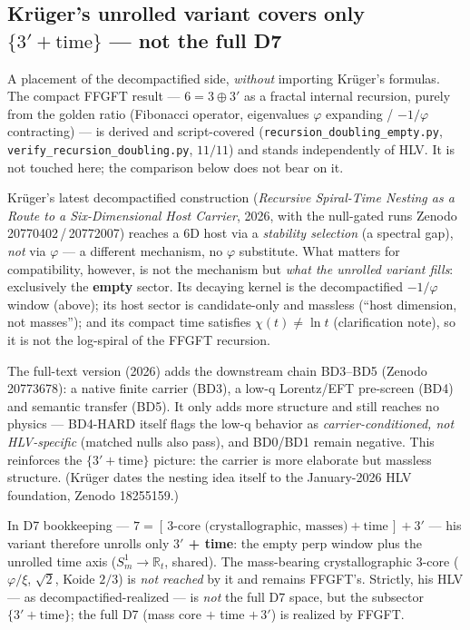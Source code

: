 \subsection{Kr\"uger's unrolled variant covers only $\{3'+\text{time}\}$ --- not the full D7}
A placement of the decompactified side, \emph{without} importing Kr\"uger's formulas. The compact
FFGFT result --- $6=3\oplus3'$ as a fractal internal recursion, purely from the golden ratio
(Fibonacci operator, eigenvalues $\varphi$ expanding / $-1/\varphi$ contracting) --- is derived and
script-covered (\texttt{recursion\_doubling\_empty.py}, \texttt{verify\_recursion\_doubling.py},
$11/11$) and stands independently of HLV. It is not touched here; the comparison below does not
bear on it.

Kr\"uger's latest decompactified construction (\emph{Recursive Spiral-Time Nesting as a Route to a
Six-Dimensional Host Carrier}, 2026, with the null-gated runs Zenodo 20770402\,/\,20772007) reaches
a $6$D host via a \emph{stability selection} (a spectral gap), \emph{not} via $\varphi$ --- a
different mechanism, no $\varphi$ substitute. What matters for compatibility, however, is not the
mechanism but \emph{what the unrolled variant fills}: exclusively the \textbf{empty} sector. Its
decaying kernel is the decompactified $-1/\varphi$ window (above); its host sector is candidate-only
and massless (\enquote{host dimension, not masses}); and its compact time satisfies
$\chi(t)\neq\ln t$ (clarification note), so it is not the log-spiral of the FFGFT recursion.

The full-text version (2026) adds the downstream chain BD3--BD5 (Zenodo 20773678): a native finite
carrier (BD3), a low-q Lorentz/EFT pre-screen (BD4) and semantic transfer (BD5). It only adds more
structure and still reaches no physics --- BD4-HARD itself flags the low-q behavior as
\emph{carrier-conditioned, not HLV-specific} (matched nulls also pass), and BD0/BD1 remain negative.
This reinforces the $\{3'+\text{time}\}$ picture: the carrier is more elaborate but massless
structure. (Kr\"uger dates the nesting idea itself to the January-2026 HLV foundation, Zenodo
18255159.)

In D7 bookkeeping --- $7=[\,3\text{-core (crystallographic, masses)}+\text{time}\,]+3'$ --- his
variant therefore unrolls only \textbf{$3'$ + time}: the empty perp window plus the unrolled time
axis ($S^1_m\to\mathbb{R}_t$, shared). The mass-bearing crystallographic $3$-core ($\varphi/\xi$,
$\sqrt2$, Koide $2/3$) is \emph{not reached} by it and remains FFGFT's. Strictly, his HLV ---
as decompactified-realized --- is \emph{not} the full D7 space, but the subsector
$\{3'+\text{time}\}$; the full D7 (mass core $+$ time $+\,3'$) is realized by FFGFT.

